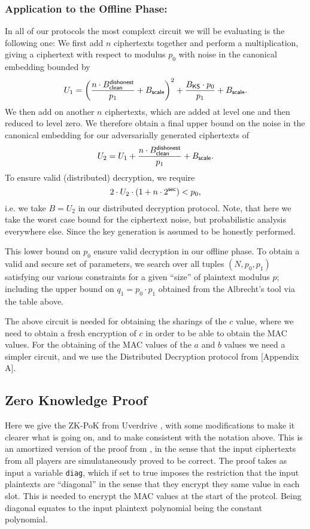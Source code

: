\subsubsection{Application to the Offline Phase:}
In all of our protocols the most complext circuit we will be evaluating 
is the following one: 
We first add $n$ ciphertexts together and perform a multiplication, giving a 
ciphertext with respect to modulus $p_0$ with noise in the canonical
embedding bounded by
\[
  U_1 = \left( \frac{n \cdot B_{\mathsf{clean}}^{\mathsf{dishonest}}}{p_1}+B_{\mathsf{scale}} \right)^2
		+ \frac{B_{\mathsf{KS}} \cdot p_0}{p_1} + B_{\mathsf{scale}}.
\]
We then add on another $n$ ciphertexts, which are added at 
level one and then reduced to level zero.
We therefore obtain a final upper bound on the noise 
in the canonical embedding for our adversarially generated ciphertexts of
\[ U_2 = U_1 +  \frac{n \cdot B_{\mathsf{clean}}^{\mathsf{dishonest}}}{p_1} + B_{\mathsf{scale}}. \]
To ensure valid (distributed) decryption, we require
\[ 2 \cdot U_2 \cdot (1+n \cdot 2^{\mathsf{sec}}) < p_0, \]
i.e. we take $B=U_2$ in our distributed decryption protocol.
Note, that here we take the worst case bound for the ciphertext
noise, but probabilistic analysis everywhere else. Since 
the key generation is assumed to be honestly performed.

This lower bound on $p_0$ ensure valid decryption in our offline phase.
To obtain a valid and secure set of parameters, we search over
all tuples $(N,p_0,p_1)$ satisfying our various constraints for
a given ``size'' of plaintext modulus $p$; including the upper bound
on $q_1=p_0 \cdot p_1$ obtained from the Albrecht's tool via 
the table above.

The above circuit is needed for obtaining the sharings of the $c$
value, where we need to obtain a fresh encryption of $c$ in order
to be able to obtain the MAC values.
For the obtaining of the MAC values of the $a$ and $b$ values
we need a simpler circuit, and we use the Distributed Decryption
protocol from \cite{KPR}[Appendix A].

\subsection{Zero Knowledge Proof}
Here we give the ZK-PoK from Uverdrive \cite{KPR}, with some modifications
to make it clearer what is going on, and to make 
consistent with the notation above.
This is an amortized version of the proof from \cite{SPDZ}, in the sense
that the input ciphertexts from all players are simulataneously proved to be
correct.
The proof takes as input a variable \verb+diag+, which if set to true
imposes the restriction that the input plaintexts are ``diagonal'' in
the sense that they encrypt they same value in each slot.
This is needed to encrypt the MAC values at the start of the protcol.
Being diagonal equates to the input plaintext polynomial being the constant
polynomial.

